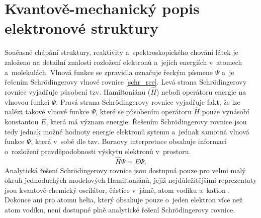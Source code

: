 \documentclass[
digital, %
table,   %
lof,     %
lot,     %
oneside,
]{fithesis3}
\begin{document}
\section{Kvantově-mechanický popis elektronové struktury}
Současné chápání struktury, reaktivity a~spektroskopického chování látek je založeno na detailní znalosti rozložení elektronů a~jejich energiích v~atomech a~molekulách. Vlnová funkce se zpravidla označuje řeckým písmene $\Psi$ a~je řešením Schrödingerovy vlnové rovnice \ref{schr_rce}. Levá strana Schrödingerovy rovnice vyjadřuje působení tzv. Hamiltoniánu ($\widehat{H}$) neboli operátoru energie na vlnovou funkci $\Psi$. Pravá strana Schrödingerovy rovnice vyjadřuje fakt, že lze nalézt takové vlnové funkce $\Psi$, které se působením operátoru $\widehat{H}$ pouze vynásobí konstantou $E$, která má význam energie. Řešením Schrödingerovy rovnice jsou tedy jednak možné hodnoty energie elektronů sytemu a~jednak samotná vlnová funkce $\Psi$, která v~sobě dle tzv. Bornovy interpretace obsahuje informaci o~rozložení pravděpodobnosti výskytu elektronů v~prostoru.
\begin{equation}
\widehat{H} \Psi = E \Psi,
\label{schr_rce}
\end{equation}
Analytická řešení Schrödingerovy rovnice jsou dostupná pouze pro velmi malý okruh jednoduchých modelových Hamiltoniánů, jejiž nejdůležitějšími reprezentaty jsou kvantově-chemický oscilátor, částice v~jámě, atom vodíku a~kation . Dokonce ani pro atomu helia, který obsahuje pouze o~jeden elektron více než atom vodíku, není dostupné plně analytické řešení Schrödingerovy rovnice.
\end{document}
